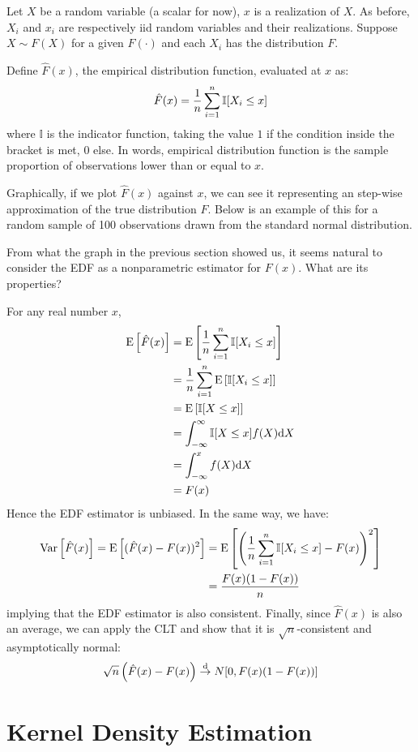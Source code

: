 Let $X$ be a random variable (a scalar for now), $x$ is a realization of $X$. As before, $X_i$ and $x_i$ are respectively iid random variables and their realizations. Suppose $X\sim F(X)$ for a given $F(\cdot)$ and each $X_i$ has the distribution $F$.

\begin{definition}
Define $\hat F(x)$, the empirical distribution function, evaluated at $x$ as: $$\hat F(x) = \frac{1}{n} \sum_{i=1}^{n}\mathbb{I}[X_i\leq x]$$ where $\mathbb{I}$ is the indicator function, taking the value $1$ if the condition inside the bracket is met, $0$ else. In words, empirical distribution function is the sample proportion of observations lower than or equal to $x$.
\end{definition}

Graphically, if we plot $\hat F(x)$ against $x$, we can see it representing an step-wise approximation of the true distribution $F$. Below is an example of this for a random sample of 100 observations drawn from the standard normal distribution.

From what the graph in the previous section showed us, it seems natural to consider the EDF as a nonparametric estimator for $F(x)$. What are its properties?

For any real number $x$,\begin{align*}
\operatorname{E}\left[\hat F(x)\right] & = \operatorname{E}\left[\frac{1}{n} \sum_{i=1}^{n}\mathbb{I}[X_i\leq x]\right] \\
& = \frac{1}{n} \sum_{i=1}^{n}\operatorname{E}\left[\mathbb{I}[X_i\leq x]\right] \\ & = \operatorname{E}\left[\mathbb{I}[X\leq x]\right] \\
& = \int_{-\infty}^{\infty} \mathbb{I}[X\leq x]f(X)\mathrm{d} X \\
& = \int_{-\infty}^{x} f(X)\mathrm{d} X \\ & = F(x)
\end{align*}
Hence the EDF estimator is unbiased. In the same way, we have: \begin{align*}
\operatorname{Var}\left[\hat F(x)\right] = \operatorname{E}\left[(\hat F(x) - F(x))^2\right] & = \operatorname{E}\left[\left(\frac{1}{n} \sum_{i=1}^{n}\mathbb{I}[X_i\leq x] - F(x)\right)^2\right] \\
& = \frac{F(x)(1 - F(x))}{n}
\end{align*} implying that the EDF estimator is also consistent. Finally, since $\hat F(x)$ is also an average, we can apply the CLT and show that it is $\sqrt{n}$-consistent and asymptotically normal: $$\sqrt{n}\left(\hat F(x) - F(x)\right) \overset{\text{d}}{\to} N[0,F(x)(1 - F(x))] $$ 

\section{Kernel Density Estimation}

